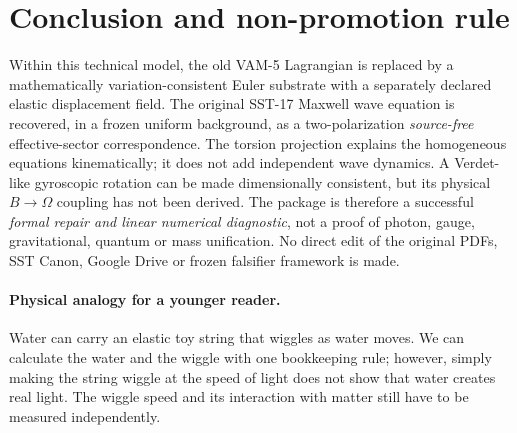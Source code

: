 \documentclass[11pt,a4paper]{article}
\begin{document}
\section{Conclusion and non-promotion rule}
Within this technical model, the old VAM-5 Lagrangian is replaced by a mathematically variation-consistent Euler substrate with a separately declared elastic displacement field. The original SST-17 Maxwell wave equation is recovered, in a frozen uniform background, as a two-polarization \emph{source-free} effective-sector correspondence. The torsion projection explains the homogeneous equations kinematically; it does not add independent wave dynamics. A Verdet-like gyroscopic rotation can be made dimensionally consistent, but its physical $B\to\Omega$ coupling has not been derived. The package is therefore a successful \emph{formal repair and linear numerical diagnostic}, not a proof of photon, gauge, gravitational, quantum or mass unification. No direct edit of the original PDFs, SST Canon, Google Drive or frozen falsifier framework is made.

\paragraph*{Physical analogy for a younger reader.}
Water can carry an elastic toy string that wiggles as water moves. We can calculate the water and the wiggle with one bookkeeping rule; however, simply making the string wiggle at the speed of light does not show that water creates real light. The wiggle speed and its interaction with matter still have to be measured independently.
\end{document}
